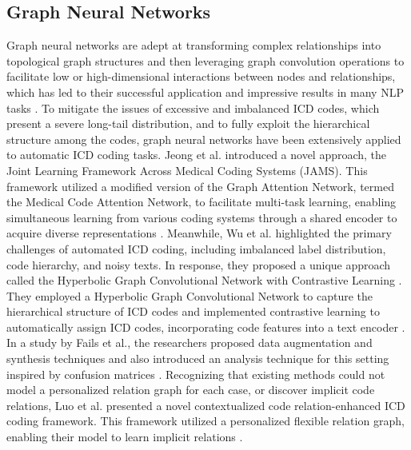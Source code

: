 \subsection{Graph Neural Networks}
Graph neural networks are adept at transforming complex relationships into topological graph structures and then leveraging graph convolution operations to facilitate low or high-dimensional interactions between nodes and relationships, which has led to their successful application and impressive results in many NLP tasks \cite{zhou2020graph,wu2020comprehensive,zheng2022graph,zhang2019heterogeneous}. To mitigate the issues of excessive and imbalanced ICD codes, which present a severe long-tail distribution, and to fully exploit the hierarchical structure among the codes, graph neural networks have been extensively applied to automatic ICD coding tasks. Jeong et al. introduced a novel approach, the Joint Learning Framework Across Medical Coding Systems (JAMS). This framework utilized a modified version of the Graph Attention Network, termed the Medical Code Attention Network, to facilitate multi-task learning, enabling simultaneous learning from various coding systems through a shared encoder to acquire diverse representations \cite{jeong2024bridging}. Meanwhile, Wu et al. highlighted the primary challenges of automated ICD coding, including imbalanced label distribution, code hierarchy, and noisy texts. In response, they proposed a unique approach called the Hyperbolic Graph Convolutional Network \cite{chami2019hyperbolic} with Contrastive Learning \cite{you2020graph}. They employed a Hyperbolic Graph Convolutional Network to capture the hierarchical structure of ICD codes and implemented contrastive learning to automatically assign ICD codes, incorporating code features into a text encoder \cite{wu2024hyperbolic}. In a study by Fails et al., the researchers proposed data augmentation and synthesis techniques and also introduced an analysis technique for this setting inspired by confusion matrices \cite{falis2022horses}. Recognizing that existing methods could not model a personalized relation graph for each case, or discover implicit code relations, Luo et al. presented a novel contextualized code relation-enhanced ICD coding framework. This framework utilized a personalized flexible relation graph, enabling their model to learn implicit relations \cite{luo2024corelation}.

